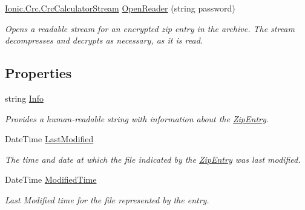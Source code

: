 \begin{DoxyCompactItemize}
\mbox{\hyperlink{class_super_tiled2_unity_1_1_ionic_1_1_crc_1_1_crc_calculator_stream}{Ionic.\+Crc.\+Crc\+Calculator\+Stream}} \mbox{\hyperlink{class_super_tiled2_unity_1_1_ionic_1_1_zip_1_1_zip_entry_ab85b4a5dd2d9b10e53a63b34c77cac83}{Open\+Reader}} (string password)
\begin{DoxyCompactList}\small\item\em Opens a readable stream for an encrypted zip entry in the archive. The stream decompresses and decrypts as necessary, as it is read. \end{DoxyCompactList}\end{DoxyCompactItemize}
\subsection*{Properties}
\begin{DoxyCompactItemize}
\item 
string \mbox{\hyperlink{class_super_tiled2_unity_1_1_ionic_1_1_zip_1_1_zip_entry_aef716e6024192e012aee41fe721bd7d2}{Info}}
\begin{DoxyCompactList}\small\item\em Provides a human-\/readable string with information about the \mbox{\hyperlink{class_super_tiled2_unity_1_1_ionic_1_1_zip_1_1_zip_entry}{Zip\+Entry}}. \end{DoxyCompactList}\item 
Date\+Time \mbox{\hyperlink{class_super_tiled2_unity_1_1_ionic_1_1_zip_1_1_zip_entry_acd1234fd27c216b59c166c2b96aba3dd}{Last\+Modified}}
\begin{DoxyCompactList}\small\item\em The time and date at which the file indicated by the {\ttfamily \mbox{\hyperlink{class_super_tiled2_unity_1_1_ionic_1_1_zip_1_1_zip_entry}{Zip\+Entry}}} was last modified. \end{DoxyCompactList}\item 
Date\+Time \mbox{\hyperlink{class_super_tiled2_unity_1_1_ionic_1_1_zip_1_1_zip_entry_a88021d72ea8b94c762388d92d74c2e0d}{Modified\+Time}}
\begin{DoxyCompactList}\small\item\em Last Modified time for the file represented by the entry. \end{DoxyCompactList}\item 

\end{DoxyCompactItemize}
